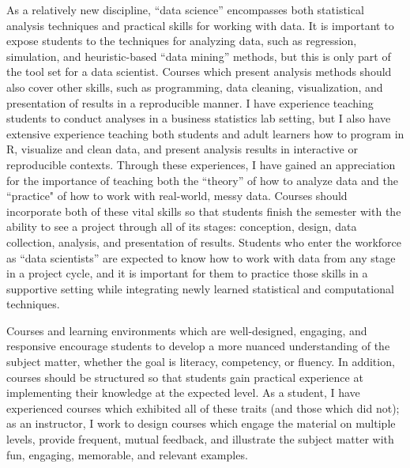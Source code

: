 \documentclass[12pt, letterpaper, sans]{moderncv}
\begin{document}
\vspace{.5cm}\hspace{8pt}
As a relatively new discipline, ``data science'' encompasses both statistical analysis techniques and practical skills for working with data. It is important to expose students to the techniques for analyzing data, such as regression, simulation, and heuristic-based ``data mining'' methods, but this is only part of the tool set for a data scientist. Courses which present analysis methods should also cover other skills, such as programming, data cleaning, visualization, and presentation of results in a reproducible manner. I have experience teaching students to conduct analyses in a business statistics lab setting, but I also have extensive experience teaching both students and adult learners how to program in R, visualize and clean data, and present analysis results in interactive or reproducible contexts. Through these experiences, I have gained an appreciation for the importance of teaching both the ``theory'' of how to analyze data and the ``practice" of how to work with real-world, messy data. Courses should incorporate both of these vital skills so that students finish the semester with the ability to see a project through all of its stages: conception, design, data collection, analysis, and presentation of results. Students who enter the workforce as ``data scientists'' are expected to know how to work with data from any stage in a project cycle, and it is important for them to practice those skills in a supportive setting while integrating newly learned statistical and computational techniques.

\vspace{.5cm}\noindent Courses and learning environments which are well-designed, engaging, and responsive encourage students to develop a more nuanced understanding of the subject matter, whether the goal is literacy, competency, or fluency. In addition, courses should be structured so that students gain practical experience at implementing their knowledge at the expected level. As a student, I have experienced courses which exhibited all of these traits (and those which did not); as an instructor, I work to design courses which engage the material on multiple levels, provide frequent, mutual feedback, and illustrate the subject matter with fun, engaging, memorable, and relevant examples.
\end{document}
